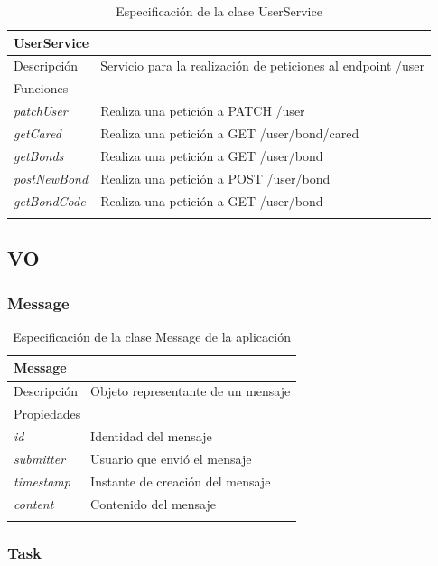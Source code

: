 \begin{longtable}{|p{} p{}|}
    \hline
    \multicolumn{2}{|l|}{UserService} \\ \hline \hline
    Descripción      & Servicio para la realización de peticiones al endpoint /user \\ \hline
    \multicolumn{2}{|l|}{Funciones} \\
    \emph{patchUser}  & Realiza una petición a PATCH /user \\
    \emph{getCared}  & Realiza una petición a GET /user/bond/cared \\
    \emph{getBonds}  & Realiza una petición a GET /user/bond \\
    \emph{postNewBond}  & Realiza una petición a POST /user/bond \\
    \emph{getBondCode}  & Realiza una petición a GET /user/bond \\  \hline
    \caption{Especificación de la clase UserService}
    \label{class:app:user_service}
\end{longtable}

\subsection{VO}

\subsubsection{Message}

\begin{longtable}{|p{} p{}|}
    \hline
    \multicolumn{2}{|l|}{Message} \\ \hline \hline
    Descripción      & Objeto representante de un mensaje \\ \hline
    \multicolumn{2}{|l|}{Propiedades} \\
    \emph{id}  & Identidad del mensaje \\
    \emph{submitter}  & Usuario que envió el mensaje \\
    \emph{timestamp}  & Instante de creación del mensaje \\
    \emph{content}  & Contenido del mensaje \\  \hline
    \caption{Especificación de la clase Message de la aplicación}
    \label{class:app:message}
\end{longtable}

\subsubsection{Task}

